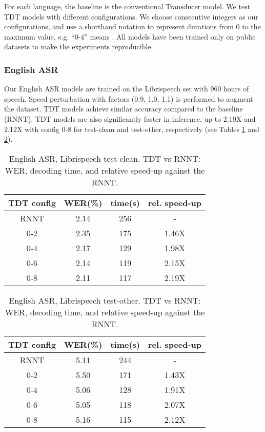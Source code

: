 \documentclass{article}
\begin{document}
For each language, the baseline is the conventional Transducer model. We test  TDT models with different  configurations. We choose consecutive integers as our configurations, and use a shorthand notation to represent durations from 0 to the maximum value, e.g. ``0-4'' means . All  models have been trained only on public datasets to make the experiments reproducible. 



\subsubsection{English ASR}
Our English ASR models are trained on the Librispeech \cite{panayotov2015librispeech} set with 960 hours of speech. Speed perturbation with factors (0.9, 1.0, 1.1) is performed to augment the dataset. TDT models achieve similar  accuracy compared to the baseline (RNNT). TDT models are also  significantly faster in inference, up to 2.19X and 2.12X with config 0-8 for test-clean and test-other, respectively (see Tables \ref{tab:librispeech_clean} and \ref{tab:librispeech}).

\begin{table}
    \centering
    \begin{tabular}{cccc}
    \toprule
         TDT config & WER(\%) & time(s) & rel. speed-up \\
    \midrule
    RNNT  & 2.14 & 256 & - \\
        0-2 & 2.35 & 175 & 1.46X \\
        0-4 & 2.17 & 129 & 1.98X \\
        0-6 & 2.14 & 119 & 2.15X \\
        0-8 & 2.11 & 117 & 2.19X \\
    \bottomrule
    \end{tabular}
    \caption{English ASR, Librispeech test-clean. TDT vs RNNT: WER, decoding time, and relative speed-up against the RNNT.
    }
    \label{tab:librispeech_clean}
\end{table}

\begin{table}
    \centering
    \begin{tabular}{cccc}
    \toprule
        TDT config & WER(\%) & time(s) & rel. speed-up \\
    \midrule
   RNNT & 5.11 & 244 & - \\
   \hline
        0-2 & 5.50 & 171 & 1.43X \\
        0-4 & 5.06 & 128 & 1.91X \\
        0-6 & 5.05 & 118 & 2.07X \\
        0-8 & 5.16 & 115 & 2.12X \\
    \bottomrule
    \end{tabular}
    \caption{English ASR, Librispeech test-other. TDT vs RNNT: WER, decoding time, and relative speed-up against the RNNT. 
}
    \label{tab:librispeech}
\end{table}
\end{document}
